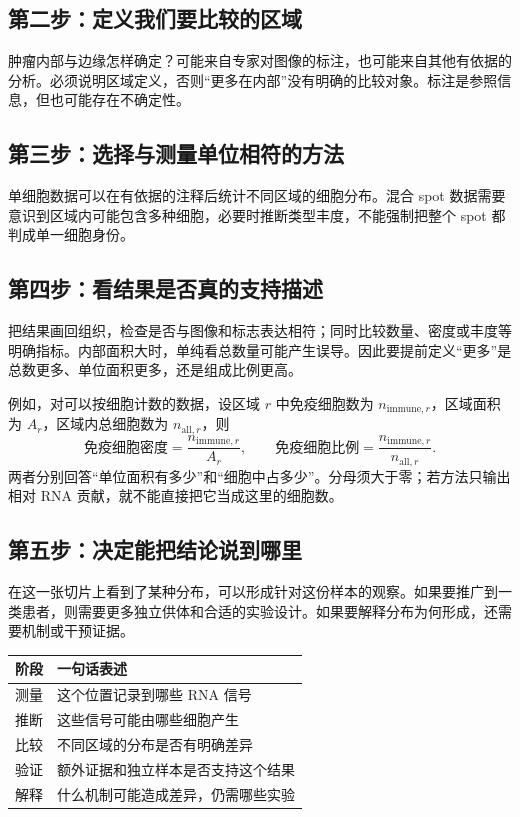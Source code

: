 \documentclass[UTF8,a4paper,11pt,fontset=fandol]{ctexart}
\renewcommand{\arraystretch}{1.3}
\begin{document}
\subsection{第二步：定义我们要比较的区域}
肿瘤内部与边缘怎样确定？可能来自专家对图像的标注，也可能来自其他有依据的分析。必须说明区域定义，否则“更多在内部”没有明确的比较对象。标注是参照信息，但也可能存在不确定性。

\subsection{第三步：选择与测量单位相符的方法}
单细胞数据可以在有依据的注释后统计不同区域的细胞分布。混合 spot 数据需要意识到区域内可能包含多种细胞，必要时推断类型丰度，不能强制把整个 spot 都判成单一细胞身份。

\subsection{第四步：看结果是否真的支持描述}
把结果画回组织，检查是否与图像和标志表达相符；同时比较数量、密度或丰度等明确指标。内部面积大时，单纯看总数量可能产生误导。因此要提前定义“更多”是总数更多、单位面积更多，还是组成比例更高。

例如，对可以按细胞计数的数据，设区域 $r$ 中免疫细胞数为 $n_{\mathrm{immune},r}$，区域面积为 $A_r$，区域内总细胞数为 $n_{\mathrm{all},r}$，则
\[
  \text{免疫细胞密度}=\frac{n_{\mathrm{immune},r}}{A_r},\qquad
  \text{免疫细胞比例}=\frac{n_{\mathrm{immune},r}}{n_{\mathrm{all},r}}.
\]
两者分别回答“单位面积有多少”和“细胞中占多少”。分母须大于零；若方法只输出相对 RNA 贡献，就不能直接把它当成这里的细胞数。

\subsection{第五步：决定能把结论说到哪里}
在这一张切片上看到了某种分布，可以形成针对这份样本的观察。如果要推广到一类患者，则需要更多独立供体和合适的实验设计。如果要解释分布为何形成，还需要机制或干预证据。

\begingroup\renewcommand{\arraystretch}{1.1}
\begin{center}
\begin{tabularx}{\linewidth}{@{}l Y@{}}
\toprule
{}
阶段 & 一句话表述 \\
\midrule
测量 & 这个位置记录到哪些 RNA 信号 \\
推断 & 这些信号可能由哪些细胞产生 \\
比较 & 不同区域的分布是否有明确差异 \\
验证 & 额外证据和独立样本是否支持这个结果 \\
解释 & 什么机制可能造成差异，仍需哪些实验 \\
\bottomrule
\end{tabularx}
\end{center}
\endgroup
\end{document}
